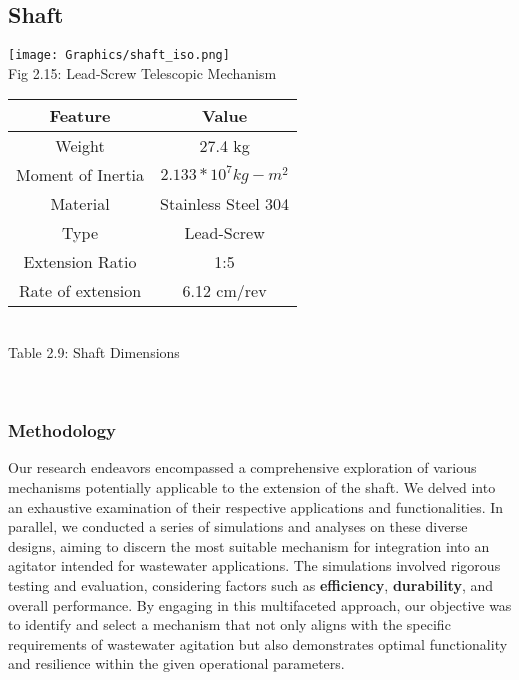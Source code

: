\documentclass[a4,10pt]{report}
\begin{document}
\subsection{Shaft}
\begin{center}
\texttt{[image: Graphics/shaft\_iso.png]} \\
Fig 2.15: Lead-Screw Telescopic Mechanism \\
\vspace{2mm}
\begin{tabular}{|c|c|}
    \hline
    Feature & Value \\
    \hline
    Weight & 27.4 kg \\
    Moment of Inertia & $2.133*10^7 kg-m^2$ \\
    Material & Stainless Steel 304 \\
    Type & Lead-Screw \\
    Extension Ratio & 1:5 \\
    Rate of extension & 6.12 cm/rev \\
    \hline
\end{tabular} \\
\vspace{1mm}
\normalsize{Table 2.9: Shaft Dimensions} \\
\end{center} \\
\subsubsection{Methodology}
Our research endeavors encompassed a comprehensive exploration of various mechanisms potentially applicable to the extension of the shaft. We delved into an exhaustive examination of their respective applications and functionalities. In parallel, we conducted a series of simulations and analyses on these diverse designs, aiming to discern the most suitable mechanism for integration into an agitator intended for wastewater applications. The simulations involved rigorous testing and evaluation, considering factors such as \textbf{efficiency}, \textbf{durability}, and overall performance. By engaging in this multifaceted approach, our objective was to identify and select a mechanism that not only aligns with the specific requirements of wastewater agitation but also demonstrates optimal functionality and resilience within the given operational parameters. \\
\end{document}
